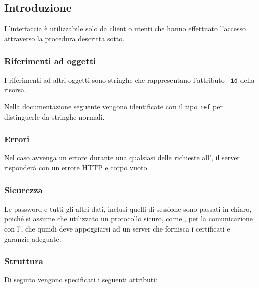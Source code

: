 \subsection{Introduzione}

    \par L'interfaccia  è utilizzabile solo da client o utenti che hanno effettuato l'accesso
    attraverso la procedura descritta sotto.
    
    \subsubsection{Riferimenti ad oggetti}
    	\par I riferimenti ad altri oggetti sono stringhe che rappresentano l'attributo \texttt{\_id} della risorsa. 
    	
    	\par Nella documentazione seguente vengono identificate con il tipo \texttt{ref} per distinguerle da stringhe normali.

    \subsubsection{Errori}

        \par Nel caso avvenga un errore durante una qualsiasi delle richieste all', il server risponderà
        con un errore HTTP e corpo vuoto.
        
    \subsubsection{Sicurezza}
    
    	\par Le password e tutti gli altri dati, inclusi
    		quelli di sessione sono passati in chiaro, poiché si assume che 
    		utilizzato un protocollo sicuro, come , per la 
    		comunicazione con l', che quindi deve appoggiarsi ad un
    		server che fornisca i certificati e garanzie adeguate.

    \subsubsection{Struttura}

        Di seguito vengono specificati i seguenti attributi:

